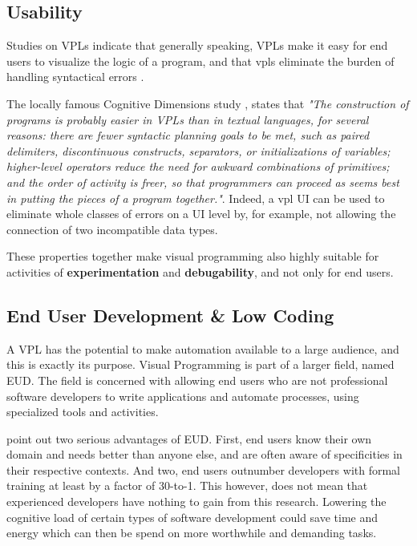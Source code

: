 \subsection{Usability}

Studies on \ac{VPL}s indicate that generally speaking, VPLs make it easy for end users to visualize the logic of a program, and that vpls eliminate the burden of handling syntactical errors \cite{kuhail_characterizing_2021}.

The locally famous Cognitive Dimensions study \cite{green_usability_1996}, states that \emph{"The construction of programs is probably easier in VPLs than in textual languages, for several reasons: 
there are fewer syntactic planning goals to be met, such as paired delimiters, discontinuous constructs, separators, or initializations of variables; 
higher-level operators reduce the need for awkward combinations of primitives; 
and the order of activity is freer, so that programmers can proceed as seems best in putting the pieces of a program together."}. 
Indeed, a vpl UI can be used to eliminate whole classes of errors on a UI level by, for example, not allowing the connection of two incompatible data types. 

These properties together make visual programming also highly suitable for activities of \textbf{experimentation} and \textbf{debugability}, and not only for end users. 


\subsection{End User Development \& Low Coding}
A \ac{VPL} has the potential to make automation available to a large audience, and this is exactly its purpose. 
Visual Programming is part of a larger field, named \ac{EUD}. 
The field is concerned with allowing end users who are not professional software developers to write applications and automate processes, using specialized tools and activities. 

\citet{kuhail_characterizing_2021} point out two serious advantages of EUD. 
First, end users know their own domain and needs better than anyone else, and are often aware of specificities in their respective contexts. 
And two, end users outnumber developers with formal training at least by a factor of 30-to-1.
This however, does not mean that experienced developers have nothing to gain from this research. 
Lowering the cognitive load of certain types of software development could save time and energy which can then be spend on more worthwhile and demanding tasks. 

